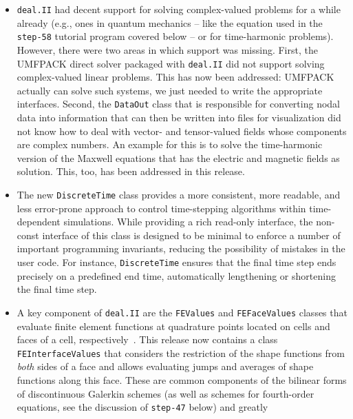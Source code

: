 \documentclass{ansarticle-preprint}
\newcommand{\specialword}[1]{\texttt{#1}}
\newcommand{\dealii}{{\specialword{deal.II}}\xspace}
\begin{document}
\begin{itemize}
  \item \dealii{} had decent support for solving complex-valued problems
        for a while already
        (e.g., ones in quantum mechanics -- like the equation used in the
        \texttt{step-58} tutorial program covered below -- or for
        time-harmonic problems). However, there were two
        areas in which support was missing. First, the UMFPACK direct solver
        packaged with \dealii{} did not support solving complex-valued
        linear problems. This has now been addressed: UMFPACK actually can
        solve such systems, we just needed to write the appropriate
        interfaces. Second, the \texttt{DataOut} class that is responsible
        for converting nodal data into information that can then be written
        into files for visualization did not know how to deal with vector-
        and tensor-valued fields whose components are complex numbers. An
        example for this is to solve the time-harmonic version of the
        Maxwell equations that has the electric and magnetic fields as
        solution. This, too, has been addressed in this release.
  \item The new \texttt{DiscreteTime} class provides a more
        consistent, more readable, and less error-prone approach to control
        time-stepping algorithms within time-dependent simulations.
        While providing a rich read-only interface, the non-const interface
        of this class is designed to be minimal
        to enforce a number of important programming invariants, reducing
        the possibility of mistakes in the user code.
        For instance, \texttt{DiscreteTime} ensures that the final time step ends
        precisely on a predefined end time, automatically
        lengthening or shortening the final time step.
  \item A key component of \dealii{} are the \texttt{FEValues} and
        \texttt{FEFaceValues} classes that evaluate finite element functions
        at quadrature points located on cells and faces of a cell,
        respectively~\cite{BangerthHartmannKanschat2007}. This release now
        contains a class \texttt{FEInterfaceValues} that considers the
        restriction of the shape functions from \textit{both} sides of a face and
        allows evaluating jumps and averages of shape functions along this
        face. These are common components of the bilinear forms of
        discontinuous Galerkin schemes (as well as schemes for fourth-order
        equations, see the discussion of \texttt{step-47} below) and greatly

\end{itemize}
\end{document}
